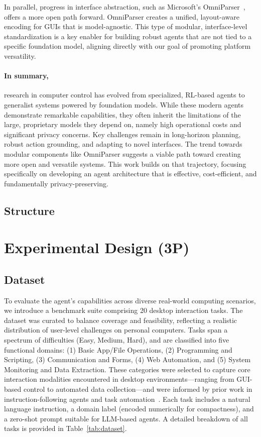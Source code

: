 \documentclass[runningheads]{llncs}
\begin{document}
In parallel, progress in interface abstraction, such as Microsoft's OmniParser~\cite{li2024omnionly}, offers a more open path forward. OmniParser creates a unified, layout-aware encoding for GUIs that is model-agnostic. This type of modular, interface-level standardization is a key enabler for building robust agents that are not tied to a specific foundation model, aligning directly with our goal of promoting platform versatility.

\paragraph{In summary,} research in computer control has evolved from specialized, RL-based agents to generalist systems powered by foundation models. While these modern agents demonstrate remarkable capabilities, they often inherit the limitations of the large, proprietary models they depend on, namely high operational costs and significant privacy concerns. Key challenges remain in long-horizon planning, robust action grounding, and adapting to novel interfaces. The trend towards modular components like OmniParser suggests a viable path toward creating more open and versatile systems. This work builds on that trajectory, focusing specifically on developing an agent architecture that is effective, cost-efficient, and fundamentally privacy-preserving.

\subsection{Structure}



\section{Experimental Design (3P) }
\subsection{Dataset}
To evaluate the agent's capabilities across diverse real-world computing scenarios, we introduce a benchmark suite comprising 20 desktop interaction tasks. The dataset was curated to balance coverage and feasibility, reflecting a realistic distribution of user-level challenges on personal computers. Tasks span a spectrum of difficulties (Easy, Medium, Hard), and are classified into five functional domains: (1) Basic App/File Operations, (2) Programming and Scripting, (3) Communication and Forms, (4) Web Automation, and (5) System Monitoring and Data Extraction. These categories were selected to capture core interaction modalities encountered in desktop environments—ranging from GUI-based control to automated data collection—and were informed by prior work in instruction-following agents and task automation~\cite{sager2025review,li2024omnionly}. Each task includes a natural language instruction, a domain label (encoded numerically for compactness), and a zero-shot prompt suitable for LLM-based agents. A detailed breakdown of all tasks is provided in Table~\ref{tab:dataset}.
\end{document}
